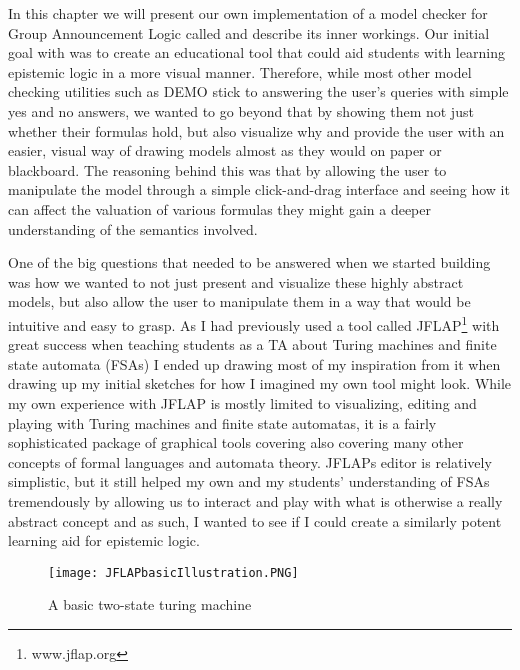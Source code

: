 In this chapter we will present our own implementation of a model checker for Group Announcement Logic called \cname{} and describe its inner workings. Our initial goal with \cname{} was to create an educational tool that could aid students with learning epistemic logic in a more visual manner. Therefore, while most other model checking utilities such as DEMO \cite{JanvanEijck} stick to answering the user's queries with simple yes and no answers, we wanted to go beyond that by showing them not just whether their formulas hold, but also visualize why and provide the user with an easier, visual way of drawing models almost as they would on paper or blackboard. The reasoning behind this was that by allowing the user to manipulate the model through a simple click-and-drag interface and seeing how it can affect the valuation of various formulas they might gain a deeper understanding of the semantics involved.

One of the big questions that needed to be answered when we started building \cname{} was how we wanted to not just present and visualize these highly abstract models, but also allow the user to manipulate them in a way that would be intuitive and easy to grasp. As I had previously used a tool called JFLAP\footnote{www.jflap.org} with great success when teaching students as a TA about Turing machines and finite state automata (FSAs) I ended up drawing most of my inspiration from it when drawing up my initial sketches for how I imagined my own tool might look. While my own experience with JFLAP is mostly limited to visualizing, editing and playing with Turing machines and finite state automatas, it is a fairly sophisticated package of graphical tools covering also covering many other concepts of formal languages and automata theory. JFLAPs editor is relatively simplistic, but it still helped my own and my students' understanding of FSAs tremendously by allowing us to interact and play with what is otherwise a really abstract concept and as such, I wanted to see if I could create a similarly potent learning aid for epistemic logic. 

\begin{figure}[H]
	\label{fig:JFLAP_basic illustration}
	\caption{A basic two-state turing machine}
	\texttt{[image: JFLAPbasicIllustration.PNG]}
\end{figure}


